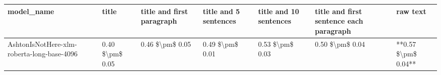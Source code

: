 \begin{tabular}{lllllll}
\toprule
                                model\_name &           title & title and first paragraph & title and 5 sentences & title and 10 sentences & title and first sentence each paragraph &            raw text \\
\midrule
AshtonIsNotHere-xlm-roberta-long-base-4096 & 0.40 \$\textbackslash pm\$ 0.05 &           0.46 \$\textbackslash pm\$ 0.05 &       0.49 \$\textbackslash pm\$ 0.01 &        0.53 \$\textbackslash pm\$ 0.03 &                         0.50 \$\textbackslash pm\$ 0.04 & **0.57 \$\textbackslash pm\$ 0.04** \\
\bottomrule
\end{tabular}
